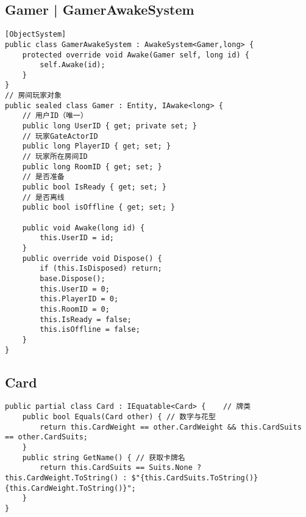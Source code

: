 \documentclass[9pt, b5paper]{article}
\begin{document}
\subsection{Gamer | GamerAwakeSystem}
\label{sec-3-2}
\begin{verbatim}
[ObjectSystem]
public class GamerAwakeSystem : AwakeSystem<Gamer,long> {
    protected override void Awake(Gamer self, long id) {
        self.Awake(id);
    }
}
// 房间玩家对象
public sealed class Gamer : Entity, IAwake<long> {
    // 用户ID（唯一）
    public long UserID { get; private set; }
    // 玩家GateActorID
    public long PlayerID { get; set; }
    // 玩家所在房间ID
    public long RoomID { get; set; }
    // 是否准备
    public bool IsReady { get; set; }
    // 是否离线
    public bool isOffline { get; set; }

    public void Awake(long id) {
        this.UserID = id;
    }
    public override void Dispose() {
        if (this.IsDisposed) return;
        base.Dispose();
        this.UserID = 0;
        this.PlayerID = 0;
        this.RoomID = 0;
        this.IsReady = false;
        this.isOffline = false;
    }
}
\end{verbatim}
\subsection{Card}
\label{sec-3-3}
\begin{verbatim}
public partial class Card : IEquatable<Card> {    // 牌类
    public bool Equals(Card other) { // 数字与花型 
        return this.CardWeight == other.CardWeight && this.CardSuits == other.CardSuits;
    }
    public string GetName() { // 获取卡牌名
        return this.CardSuits == Suits.None ? this.CardWeight.ToString() : $"{this.CardSuits.ToString()}{this.CardWeight.ToString()}";
    }
}
\end{verbatim}
\subsection{}
\label{sec-3-4}
\end{document}
